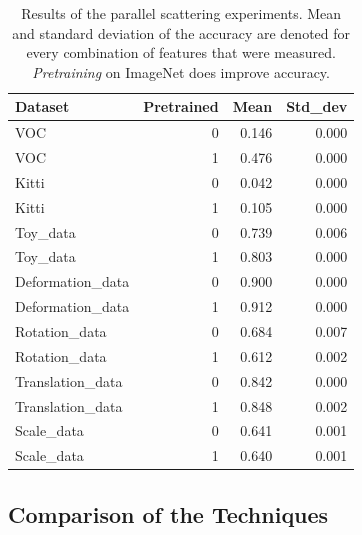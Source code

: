 \begin{table}[!htb]
	\centering
	\caption{Results of the parallel scattering experiments. Mean and standard deviation of the accuracy are denoted for every combination of features that were measured. \textit{Pretraining} on ImageNet does improve accuracy.}
	\begin{tabular}{lrrr}
		\toprule
		Dataset &  Pretrained &   Mean &  Std\_dev \\
		\midrule
		VOC &           0 &  0.146 &    0.000 \\
		VOC &           1 &  0.476 &    0.000 \\\hdashline
		Kitti &           0 &  0.042 &    0.000 \\
		Kitti &           1 &  0.105 &    0.000 \\ \hdashline
		Toy\_data &           0 &  0.739 &    0.006 \\
		Toy\_data &           1 &  0.803 &    0.000 \\ \hdashline
		Deformation\_data &           0 &  0.900 &    0.000 \\
		Deformation\_data &           1 &  0.912 &    0.000 \\ \hdashline
		Rotation\_data &           0 &  0.684 &    0.007 \\
		Rotation\_data &           1 &  0.612 &    0.002 \\ \hdashline
		Translation\_data &           0 &  0.842 &    0.000 \\
		Translation\_data &           1 &  0.848 &    0.002 \\\hdashline
		Scale\_data &           0 &  0.641 &    0.001 \\
		Scale\_data &           1 &  0.640 &    0.001 \\
		\bottomrule
	\end{tabular}
\label{table:parallel_scattering_experiments}
\end{table}

\subsection{Comparison of the Techniques}
\label{subsec:comparison_results}


